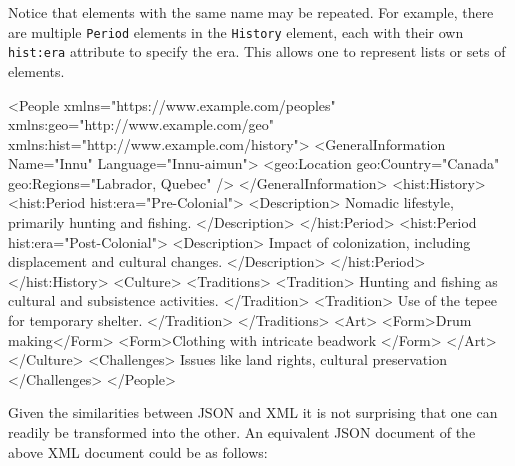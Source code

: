 Notice that elements with the same name may be repeated. For example, there are multiple \texttt{Period} elements in the \texttt{History} element, each with their own \texttt{hist:era} attribute to specify the era. This allows one to represent lists or sets of elements. 

\begin{samepage}
\begin{xmlcode}
<People
      xmlns="https://www.example.com/peoples"
      xmlns:geo="http://www.example.com/geo" 
      xmlns:hist="http://www.example.com/history">
    <GeneralInformation 
            Name="Innu" Language="Innu-aimun">
        <geo:Location geo:Country="Canada" 
                  geo:Regions="Labrador, Quebec" />
    </GeneralInformation>
    <hist:History>
        <hist:Period hist:era="Pre-Colonial">
            <Description>
                Nomadic lifestyle, primarily 
                hunting and fishing.
            </Description>
        </hist:Period>
        <hist:Period hist:era="Post-Colonial">
            <Description>
                Impact of colonization, 
                including displacement and 
                cultural changes.
            </Description>
        </hist:Period>
    </hist:History>
    <Culture>
        <Traditions>
            <Tradition>
                Hunting and fishing as cultural 
                and subsistence activities.
            </Tradition>
            <Tradition>
                Use of the tepee for temporary 
                shelter.
            </Tradition>
        </Traditions>
        <Art>
            <Form>Drum making</Form>
            <Form>Clothing with intricate beadwork
            </Form>
        </Art>
    </Culture>
    <Challenges>
        Issues like land rights, cultural preservation
    </Challenges>
</People>
\end{xmlcode}
\end{samepage}

Given the similarities between JSON and XML it is not surprising that one can readily be transformed into the other. An equivalent JSON document of the above XML document could be as follows:

